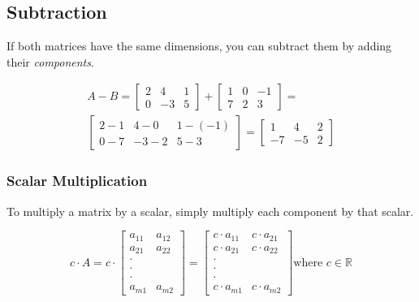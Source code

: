 \documentclass[12pt]{report}
\begin{document}
        \subsection{Subtraction}
            If both matrices have the same dimensions, you can subtract them by adding their \emph{components}.

            \begin{multline}
            A - B =
                \begin{bmatrix} 2 & 4 & 1 \\ 0 & -3 & 5 \end{bmatrix} +
                \begin{bmatrix} 1 & 0 & -1 \\ 7 & 2 & 3 \end{bmatrix} = \\
                \begin{bmatrix} 2 - 1 & 4 - 0 & 1 - (-1) \\ 0 - 7 & -3 - 2 & 5 - 3 \end{bmatrix} =
                \begin{bmatrix} 1 & 4 & 2 \\ -7 & -5 & 2 \end{bmatrix}
            \end{multline}

        \subsubsection{Scalar Multiplication}
            To multiply a matrix by a scalar, simply multiply each component by that scalar.
            
            \begin{equation}
            c \cdot A = c \cdot
                \begin{bmatrix} 
                a_{11} & a_{12} \\ a_{21} & a_{22} \\ \cdot \\ \cdot \\ \cdot \\ a_{m1} & a_{m2} \end{bmatrix} =
                \begin{bmatrix}  
                c \cdot a_{11} & c \cdot a_{21} \\ c \cdot a_{21} & c \cdot a_{22} \\ \cdot \\ \cdot \\ \cdot \\  c \cdot a_{m1} & c \cdot a_{m2} \end{bmatrix} 
            \text{where } c \in \mathbb{R}
        \end{equation}
            
\end{document}
